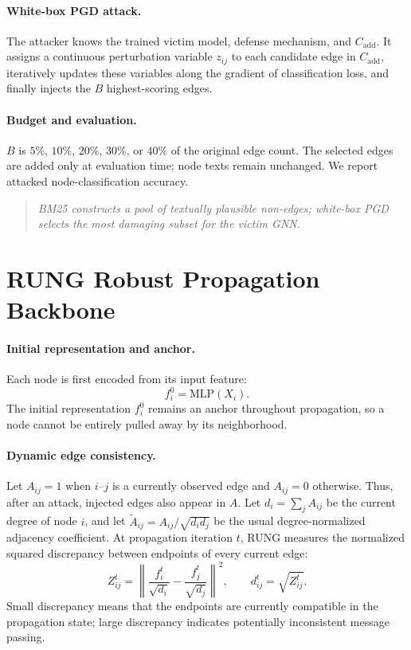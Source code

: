 \documentclass{article}
\begin{document}
\paragraph{White-box PGD attack.}
The attacker knows the trained victim model, defense mechanism, and
$C_{\mathrm{add}}$. It assigns a continuous perturbation variable $z_{ij}$ to
each candidate edge in $C_{\mathrm{add}}$, iteratively updates these variables
along the gradient of classification loss, and finally injects the $B$
highest-scoring edges.

\paragraph{Budget and evaluation.}
$B$ is $5\%$, $10\%$, $20\%$, $30\%$, or $40\%$ of the original edge count.
The selected edges are added only at evaluation time; node texts remain
unchanged. We report attacked node-classification accuracy.

\begin{quote}
\textit{BM25 constructs a pool of textually plausible non-edges; white-box PGD
selects the most damaging subset for the victim GNN.}
\end{quote}

\section{RUNG Robust Propagation Backbone}

\paragraph{Initial representation and anchor.}
Each node is first encoded from its input feature:
\[
f_i^0 = \mathrm{MLP}(X_i).
\]
The initial representation $f_i^0$ remains an anchor throughout propagation,
so a node cannot be entirely pulled away by its neighborhood.

\paragraph{Dynamic edge consistency.}
Let $A_{ij}=1$ when $i$--$j$ is a currently observed edge and $A_{ij}=0$
otherwise. Thus, after an attack, injected edges also appear in $A$. Let
$d_i=\sum_j A_{ij}$ be the current degree of node $i$, and let
$\widetilde A_{ij}=A_{ij}/\sqrt{d_i d_j}$ be the usual degree-normalized
adjacency coefficient. At propagation iteration $t$, RUNG measures the
normalized squared discrepancy between endpoints of every current edge:
\[
Z_{ij}^t = \left\|\frac{f_i^t}{\sqrt{d_i}} -
\frac{f_j^t}{\sqrt{d_j}}\right\|^2,
\qquad d_{ij}^t = \sqrt{Z_{ij}^t}.
\]
Small discrepancy means that the endpoints are currently compatible in the
propagation state; large discrepancy indicates potentially inconsistent
message passing.
\end{document}
